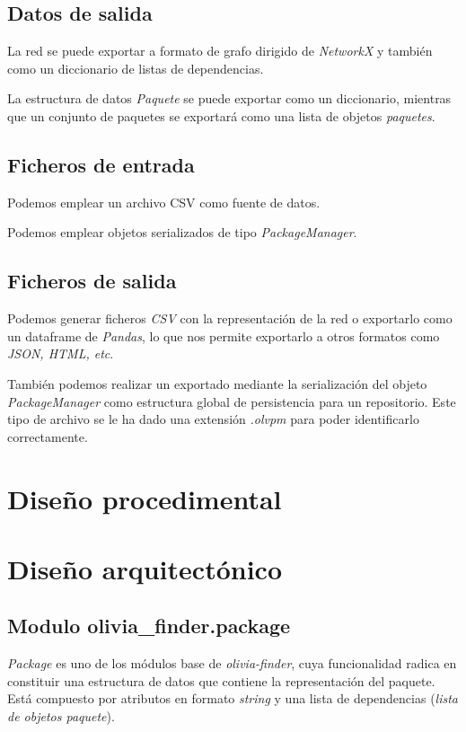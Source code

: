 \subsection{Datos de salida}
La red se puede exportar a formato de grafo dirigido de \textit{NetworkX} y también como 
un diccionario de listas de dependencias.

La estructura de datos \textit{Paquete} se puede exportar como un diccionario, mientras 
que un conjunto de paquetes se exportará como una lista de objetos \textit{paquetes}.

\subsection{Ficheros de entrada}
Podemos emplear un archivo CSV como fuente de datos.

Podemos emplear objetos serializados de tipo \textit{PackageManager}.

\subsection{Ficheros de salida}
Podemos generar ficheros \textit{CSV} con la representación de la red o exportarlo como un dataframe de \textit{Pandas},
lo que nos permite exportarlo a otros formatos como \textit{JSON, HTML, etc}.

También podemos realizar un exportado mediante la serialización del objeto \textit{PackageManager} 
como estructura global de persistencia para un repositorio. Este tipo de archivo se le ha dado una 
extensión \textit{.olvpm} para poder identificarlo correctamente.

\section{Diseño procedimental}

\section{Diseño arquitectónico}

\subsection{Modulo olivia\_finder.package}

\textit{Package} es uno de los módulos base de \textit{olivia-finder}, cuya funcionalidad radica en 
constituir una estructura de datos que contiene la representación del paquete. Está compuesto por 
atributos en formato \textit{string} y una lista de dependencias (\textit{lista de objetos paquete}).

